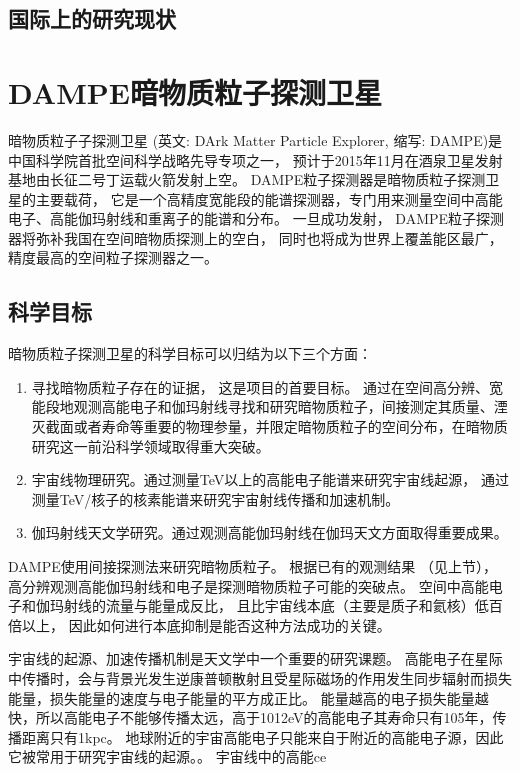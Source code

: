 \subsection{国际上的研究现状}

\section{DAMPE暗物质粒子探测卫星}
暗物质粒子子探测卫星 (英文: DArk Matter Particle Explorer, 缩写: DAMPE)是中国科学院首批空间科学战略先导专项之一， 预计于2015年11月在酒泉卫星发射基地由长征二号丁运载火箭发射上空。
DAMPE粒子探测器是暗物质粒子探测卫星的主要载荷， 它是一个高精度宽能段的能谱探测器，专门用来测量空间中高能电子、高能伽玛射线和重离子的能谱和分布。
一旦成功发射， DAMPE粒子探测器将弥补我国在空间暗物质探测上的空白， 同时也将成为世界上覆盖能区最广，精度最高的空间粒子探测器之一。

\subsection{科学目标}
暗物质粒子探测卫星的科学目标可以归结为以下三个方面：
\begin{enumerate}
	\item 寻找暗物质粒子存在的证据， 这是项目的首要目标。 通过在空间高分辨、宽能段地观测高能电子和伽玛射线寻找和研究暗物质粒子，间接测定其质量、湮灭截面或者寿命等重要的物理参量，并限定暗物质粒子的空间分布，在暗物质研究这一前沿科学领域取得重大突破。
	\item 宇宙线物理研究。通过测量TeV以上的高能电子能谱来研究宇宙线起源， 通过测量TeV/核子的核素能谱来研究宇宙射线传播和加速机制。
	\item 伽玛射线天文学研究。通过观测高能伽玛射线在伽玛天文方面取得重要成果。
\end{enumerate}

DAMPE使用间接探测法来研究暗物质粒子。
根据已有的观测结果 （见上节）， 高分辨观测高能伽玛射线和电子是探测暗物质粒子可能的突破点。
空间中高能电子和伽玛射线的流量与能量成反比， 且比宇宙线本底（主要是质子和氦核）低百倍以上， 因此如何进行本底抑制是能否这种方法成功的关键。

宇宙线的起源、加速传播机制是天文学中一个重要的研究课题。
高能电子在星际中传播时，会与背景光发生逆康普顿散射且受星际磁场的作用发生同步辐射而损失能量，损失能量的速度与电子能量的平方成正比。
能量越高的电子损失能量越快，所以高能电子不能够传播太远，高于1012eV的高能电子其寿命只有105年，传播距离只有1kpc。
地球附近的宇宙高能电子只能来自于附近的高能电子源，因此它被常用于研究宇宙线的起源。。
宇宙线中的高能ce


